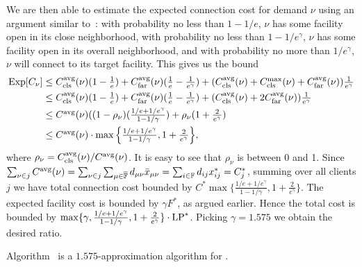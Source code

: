 We are then able to estimate the expected connection cost for demand
$\nu$ using an argument similar to~\cite{ByrkaGS10}: with probability
no less than $1-1/e$, $\nu$ has some facility open in its close
neighborhood, with probability no less than $1-1/e^\gamma$, $\nu$ has
some facility open in its overall neighborhood, and with probability
no more than $1/e^\gamma$, $\nu$ will connect to its target facility.
This gives us the bound
%
\begin{align*}
  \mbox{\rm Exp}[C_{\nu}] &\leq 
	\textstyle 
	C_{\text{cls}}^{{\mbox{\scriptsize\rm avg}}}(\nu)(1-\frac{1}{e}) + C_{\text{far}}^{{\mbox{\scriptsize\rm avg}}}(\nu)(\frac{1}{e}-\frac{1}{e^\gamma}) 
					+ (C_{\text{cls}}^{{\mbox{\scriptsize\rm avg}}}(\nu)+C_{\text{cls}}^{\max}(\nu)+C_{\text{far}}^{{\mbox{\scriptsize\rm avg}}}(\nu))\frac{1}{e^\gamma}
\\
  &\leq 
	\textstyle
	C_{\text{cls}}^{{\mbox{\scriptsize\rm avg}}}(\nu)(1-\frac{1}{e}) + C_{\text{far}}^{{\mbox{\scriptsize\rm avg}}}(\nu)(\frac{1}{e}-\frac{1}{e^\gamma})
	 			+ (C_{\text{cls}}^{{\mbox{\scriptsize\rm avg}}}(\nu)+2C_{\text{far}}^{{\mbox{\scriptsize\rm avg}}}(\nu))\frac{1}{e^\gamma}
\\
  &\leq
	\textstyle
  C^{{\mbox{\scriptsize\rm avg}}}(\nu)((1-\rho_{\nu})(\frac{1/e+1/e^\gamma}{1-1/\gamma})
  + \rho_{\nu}(1+\frac{2}{e^\gamma}) 
\\
  &\leq 
	\textstyle
	C^{{\mbox{\scriptsize\rm avg}}}(\nu) \cdot \max\Big\{\frac{1/e+1/e^\gamma}{1-1/\gamma},
  								1+\frac{2}{e^\gamma}\Big\},
\end{align*}
%
where $\rho_{\nu}=C_{\text{cls}}^{{\mbox{\scriptsize\rm avg}}}(\nu)/C^{{\mbox{\scriptsize\rm avg}}}(\nu)$. It is easy
to see that $\rho_{\nu}$ is between 0 and 1.
Since $\sum_{\nu\in j} C^{{\mbox{\scriptsize\rm avg}}}(\nu) = \sum_{\nu\in
  j}\sum_{\mu\in\overline{\mathbb{F}}} d_{\mu\nu}{\bar x}_{\mu\nu} =
\sum_{i\in\mathbb{F}} d_{ij}x_{ij}^\ast = C_j^\ast$, summing
over all clients $j$ we have total connection cost bounded
by $C^\ast \max\{\frac{1/e+1/e^\gamma}{1-1/\gamma},
1+\frac{2}{e^\gamma}\}$. The expected facility cost is
bounded by $\gamma F^\ast$, as argued earlier. Hence the
total cost is bounded by $\max\{\gamma,
\frac{1/e+1/e^\gamma}{1-1/\gamma},
1+\frac{2}{e^\gamma}\}\cdot \mbox{\rm LP}^\ast$. Picking
$\gamma=1.575$ we obtain the desired ratio.


\begin{theorem}\label{thm:ebgs}
  Algorithm~{\EBGS} is a $1.575$-approximation algorithm for \FTFP.
\end{theorem}



